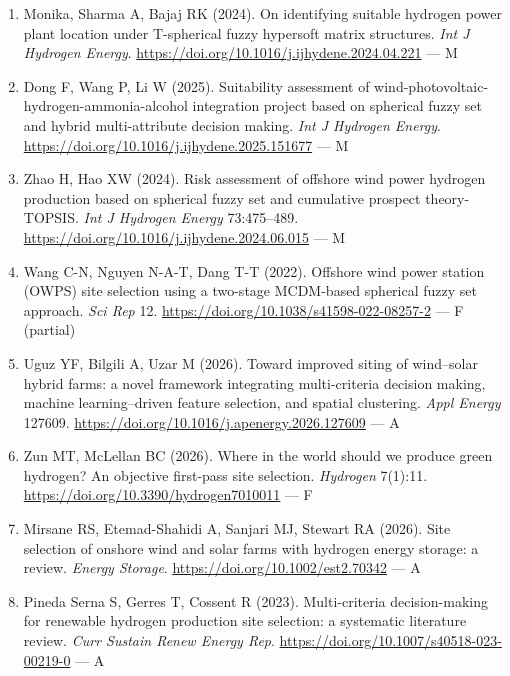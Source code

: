 \documentclass[11pt,a4paper]{article}
\begin{document}
\begin{enumerate}
  \item Monika, Sharma A, Bajaj RK (2024). On identifying suitable hydrogen power plant location under T-spherical fuzzy hypersoft matrix structures. \textit{Int J Hydrogen Energy}. \url{https://doi.org/10.1016/j.ijhydene.2024.04.221} --- M

  \item Dong F, Wang P, Li W (2025). Suitability assessment of wind-photovoltaic-hydrogen-ammonia-alcohol integration project based on spherical fuzzy set and hybrid multi-attribute decision making. \textit{Int J Hydrogen Energy}. \url{https://doi.org/10.1016/j.ijhydene.2025.151677} --- M

  \item Zhao H, Hao XW (2024). Risk assessment of offshore wind power hydrogen production based on spherical fuzzy set and cumulative prospect theory-TOPSIS. \textit{Int J Hydrogen Energy} 73:475--489. \url{https://doi.org/10.1016/j.ijhydene.2024.06.015} --- M

  \item Wang C-N, Nguyen N-A-T, Dang T-T (2022). Offshore wind power station (OWPS) site selection using a two-stage MCDM-based spherical fuzzy set approach. \textit{Sci Rep} 12. \url{https://doi.org/10.1038/s41598-022-08257-2} --- F (partial)

  \item Uguz YF, Bilgili A, Uzar M (2026). Toward improved siting of wind--solar hybrid farms: a novel framework integrating multi-criteria decision making, machine learning--driven feature selection, and spatial clustering. \textit{Appl Energy} 127609. \url{https://doi.org/10.1016/j.apenergy.2026.127609} --- A

  \item Zun MT, McLellan BC (2026). Where in the world should we produce green hydrogen? An objective first-pass site selection. \textit{Hydrogen} 7(1):11. \url{https://doi.org/10.3390/hydrogen7010011} --- F

  \item Mirsane RS, Etemad-Shahidi A, Sanjari MJ, Stewart RA (2026). Site selection of onshore wind and solar farms with hydrogen energy storage: a review. \textit{Energy Storage}. \url{https://doi.org/10.1002/est2.70342} --- A

  \item Pineda Serna S, Gerres T, Cossent R (2023). Multi-criteria decision-making for renewable hydrogen production site selection: a systematic literature review. \textit{Curr Sustain Renew Energy Rep}. \url{https://doi.org/10.1007/s40518-023-00219-0} --- A


\end{enumerate}
\end{document}
